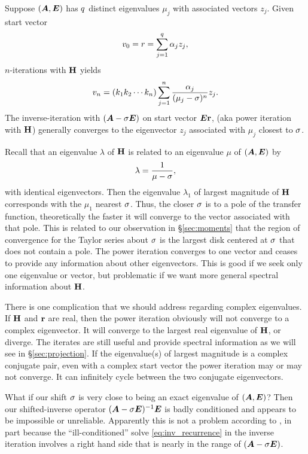 Suppose $(\bm{A},\bm{E})$ has $q$ distinct eigenvalues $\mu_j$ with associated vectors $z_j$. Given start vector 
\[
v_0 = r = \sum_{j=1}^q \alpha_j z_j,
\]
$n$-iterations with $\textbf{\textup{H}}$ yields
\begin{equation}
v_n = (k_1 k_2 \cdots k_n) \sum_{j=1}^n \frac{\alpha_j}{( \mu_j - \sigma )^n}  z_j.
\label{eq:inv_iter}
\end{equation}
The inverse-iteration with $(\bm{A}-\sigma \bm{E})$ on start vector $\bm{E} \textbf{\textup{r}}$, (aka power iteration with $\textbf{\textup{H}}$) generally converges to the eigenvector $z_j$ associated with $\mu_j$ closest to $\sigma$. 

Recall that an eigenvalue $\lambda$ of $\textbf{\textup{H}}$ is related to an eigenvalue $\mu$ of $(\bm{A},\bm{E})$ by  
\[
\lambda = \frac{1}{\mu-\sigma},
\]
with identical eigenvectors. Then the eigenvalue $\lambda_1$ of largest magnitude of $\textbf{\textup{H}}$ corresponds with the $\mu_1$ nearest $\sigma$.   Thus, the closer $\sigma$ is to a pole of the transfer function, theoretically the faster it will converge to the vector associated with that pole.   This is related to our observation in \S\ref{sec:moments} that the region of convergence for the Taylor series about $\sigma$ is the largest disk centered at $\sigma$ that does not contain a pole.  The power iteration converges to one vector and ceases to provide any information about other eigenvectors.  This is good if we seek only one eigenvalue or vector, but problematic if we want more general spectral information about $\textbf{\textup{H}}$.

\smallskip
There is one complication that we should address regarding complex eigenvalues.   If $\textbf{\textup{H}}$ and $\textbf{\textup{r}}$ are real, then the power iteration obviously will not converge to a complex eigenvector.  It will converge to the largest real eigenvalue of $\textbf{\textup{H}}$, or diverge.  The iterates are still useful and provide spectral information as we will see in \S\ref{sec:projection}.   If the eigenvalue(s) of largest magnitude is a complex conjugate pair, even with a complex start vector the power iteration may or may not converge.  It can infinitely cycle between the two conjugate eigenvectors.  

\smallskip
What if our shift $\sigma$ is very close to being an exact eigenvalue of $(\bm{A},\bm{E})$?  Then our shifted-inverse operator $(\bm{A}-\sigma \bm{E})^{-1}\bm{E}$ is  badly conditioned and appears to be impossible or unreliable.  Apparently this is not a problem according to \cite{inv_iter}, in part because  the ``ill-conditioned'' solve \eqref{eq:inv_recurrence} in the inverse iteration involves a right hand side that is nearly in the range of $(\bm{A}-\sigma \bm{E})$.

